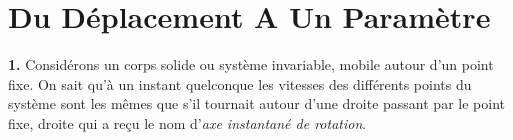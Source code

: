 \chapter{Du Déplacement A Un Paramètre}
\label{chp1}

\textbf{1.} Considérons un corps solide ou système invariable, mobile autour d'un point fixe. On sait qu'à un instant 
quelconque les vitesses des différents points du système sont les mêmes que s'il tournait autour d'une droite passant 
par le point fixe, droite qui a reçu le nom d'\textit{axe instantané de rotation}.
